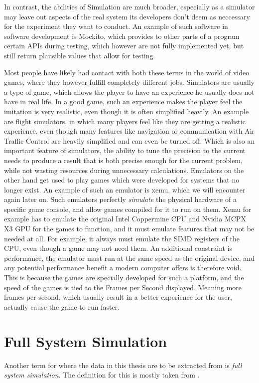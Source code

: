 In contrast, the abilities of Simulation are much broader,
especially as a simulator may leave out aspects of the real system
its developers don't deem as neccessary for the experiment they want to conduct.
An example of such software in software development is Mockito,
which provides to other parts of a program certain APIs during testing,
which however are not fully implemented yet,
but still return plausible values that allow for testing.

Most people have likely had contact with both these terms in the world of video games,
where they however fulfill completely different jobs.\linebreak
Simulators are usually a type of game,
which allows the player to have an experience he usually does not have in real life.
In a good game, such an experience makes the player feel the imitation is very realistic,
even though it is often simplified heavily.
An example are flight simulators, in which many players feel like they are getting a realistic experience,
even though many features like navigation or communication with Air Traffic Control are heavily simplified
and can even be turned off.
Which is also an important feature of simulators, the ability to tune the precision
to the current needs to produce a result that is both precise enough for the current problem,
while not wasting resources during unnecessary calculations.\linebreak
Emulators on the other hand get used to play games which were developed for systems that no longer exist.
An example of such an emulator is xemu\cite{xemu},
which we will encounter again later on.
Such emulators perfectly \emph{simulate} the physical hardware of a specific game console,
and allow games compiled for it to run on them.
Xemu for example has to emulate the original Intel Coppermine CPU and Nvidia MCPX X3 GPU
for the games to function, and it must emulate features that may not be needed at all.
For example, it always must emulate the SIMD registers of the CPU, even though a game may not need them.
An additional constraint is performance, the emulator must run at the same speed as the original device,
and any potential performance benefit a modern computer offers is therefore void.
This is because the games are specially developed for such a platform,
and the speed of the games is tied to the Frames per Second displayed.
Meaning more frames per second, which usually result in a better experience for the user,
actually cause the game to run faster.

\section{Full System Simulation}
Another term for where the data in this thesis are to be extracted from is \emph{full system simulation}.
The definition for this is mostly taken from \cite{kitcheckpoints}.

